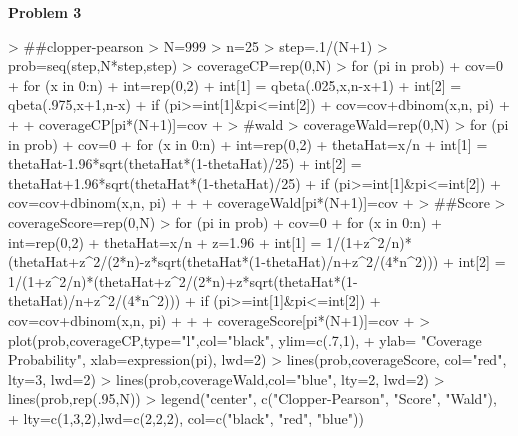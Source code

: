 \documentclass{article}
\begin{document}
\textbf{Problem 3}
\begin{Schunk}
\begin{Sinput}
> ##clopper-pearson
> N=999
> n=25
> step=.1/(N+1)
> prob=seq(step,N*step,step)
> coverageCP=rep(0,N)
> for (pi in prob){
+   cov=0
+   for (x in 0:n){
+     int=rep(0,2)
+     int[1] = qbeta(.025,x,n-x+1)
+     int[2] = qbeta(.975,x+1,n-x)
+     if (pi>=int[1]&pi<=int[2]){
+       cov=cov+dbinom(x,n, pi)
+     }
+   }
+   coverageCP[pi*(N+1)]=cov
+ }
> #wald
> coverageWald=rep(0,N)
> for (pi in prob){
+   cov=0
+   for (x in 0:n){
+     int=rep(0,2)
+     thetaHat=x/n
+     int[1] = thetaHat-1.96*sqrt(thetaHat*(1-thetaHat)/25)
+     int[2] = thetaHat+1.96*sqrt(thetaHat*(1-thetaHat)/25)
+     if (pi>=int[1]&pi<=int[2]){
+       cov=cov+dbinom(x,n, pi)
+     }
+   }
+   coverageWald[pi*(N+1)]=cov
+ }
> ##Score
> coverageScore=rep(0,N)
> for (pi in prob){
+   cov=0
+   for (x in 0:n){
+     int=rep(0,2)
+     thetaHat=x/n
+     z=1.96
+     int[1] = 1/(1+z^2/n)*(thetaHat+z^2/(2*n)-z*sqrt(thetaHat*(1-thetaHat)/n+z^2/(4*n^2)))
+     int[2] = 1/(1+z^2/n)*(thetaHat+z^2/(2*n)+z*sqrt(thetaHat*(1-thetaHat)/n+z^2/(4*n^2)))
+     if (pi>=int[1]&pi<=int[2]){
+       cov=cov+dbinom(x,n, pi)
+     }
+   }
+   coverageScore[pi*(N+1)]=cov
+ }
> plot(prob,coverageCP,type="l",col="black", ylim=c(.7,1), 
+      ylab= "Coverage Probability", xlab=expression(pi), lwd=2)
> lines(prob,coverageScore, col="red", lty=3, lwd=2)
> lines(prob,coverageWald,col="blue", lty=2, lwd=2)
> lines(prob,rep(.95,N))
> legend("center", c("Clopper-Pearson", "Score", "Wald"),
+        lty=c(1,3,2),lwd=c(2,2,2), col=c("black", "red", "blue"))
\end{Sinput}
\end{Schunk}
\end{document}
